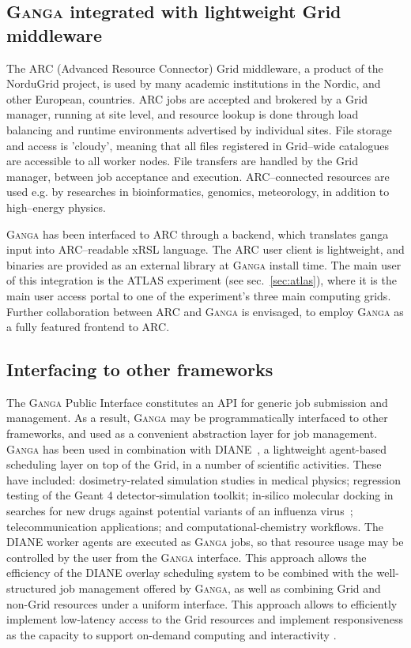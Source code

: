 \documentclass{elsart}
\def\ganga {\textsc{Ganga}\xspace}
\def\diane {\textsc{DIANE}\xspace}
\def\grid {Grid\xspace}
\begin{document}
\subsection{\ganga integrated with lightweight \grid middleware}

The ARC (Advanced Resource Connector) \grid middleware\cite{ellert_2007}, a
product of the NorduGrid project\cite{ellert_2003}, is used by many academic
institutions in the Nordic, and other European, countries. ARC jobs are accepted and
brokered by a \grid manager, running at site level, and resource lookup
is done through load balancing and runtime environments advertised by
individual sites. File storage and access is 'cloudy', meaning that
all files registered in \grid--wide catalogues are accessible to all
worker nodes. File transfers are handled by the \grid manager, between
job acceptance and execution. ARC--connected resources are used
e.g. by researches in bioinformatics, genomics, meteorology, in
addition to high--energy physics.

\ganga has been interfaced to ARC through a backend, which translates
ganga input into ARC--readable xRSL language. The ARC user client is
lightweight, and binaries are provided as an external library at \ganga
install time. The main user of this integration is the ATLAS
experiment (see sec.~\ref{sec:atlas}), where it is the main user
access portal to one of the experiment's three main computing
grids. Further collaboration between ARC and \ganga is envisaged, to
employ \ganga as a fully featured frontend to ARC.

\subsection{Interfacing to other frameworks}
\label{sec:GangaInOtherFrameworks}
The \ganga Public Interface constitutes an API for generic job submission
and management.  As a result, \ganga may be programmatically
interfaced to other frameworks, and used as a convenient abstraction layer for
job management. \ganga has been used in combination with \diane~\cite{DIANE},
a lightweight agent-based
scheduling layer on top of the \grid, in a number
of scientific activities.  These have included: dosimetry-related simulation
studies in medical physics; regression testing of the Geant 4 \cite{Geant4}
detector-simulation toolkit;
in-silico molecular docking in searches for 
new drugs against potential variants of an influenza virus~\cite{AvianFlu};
telecommunication applications; and computational-chemistry workflows. The
\diane worker agents are executed as \ganga jobs, so that resource usage
may be controlled by the user from the \ganga interface. This
approach allows the efficiency of the \diane overlay scheduling system
to be combined with the well-structured job management offered by \ganga, as well as
combining \grid and non-\grid resources under a uniform interface. This approach
allows to efficiently implement low-latency access to the \grid resources and implement
responsiveness as the capacity to support on-demand computing and interactivity 
\cite{SchedulingForResponsiveGrids}.
\end{document}
